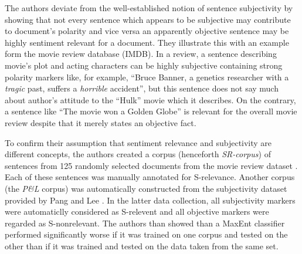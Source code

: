 \documentclass[a4paper,11pt]{article}
\begin{document}
The authors deviate from the well-established notion of sentence
subjectivity by showing that not every sentence which appears to be
subjective may contribute to document's polarity and vice versa an
apparently objective sentence may be highly sentiment relevant for a
document.  They illustrate this with an example form the movie review
database (IMDB).  In a review, a sentence describing movie's plot and
acting characters can be highly subjective containing strong polarity
markers like, for example, ``Bruce Banner, a genetics researcher with
a \textit{tragic} past, suffers a \textit{horrible} accident'', but
this sentence does not say much about author's attitude to the
``Hulk'' movie which it describes.  On the contrary, a sentence like
``The movie won a Golden Globe'' is relevant for the overall movie
review despite that it merely states an objective fact.

To confirm their assumption that sentiment relevance and subjectivity
are different concepts, the authors created a corpus (henceforth
\textit{SR-corpus}) of sentences from 125 randomly selected documents
from the movie review dataset \cite{Pang-Lee-02}.  Each of these sentences
was manually annotated for S-relevance.  Another corpus (the
\textit{P\&L} corpus) was automatically constructed from the
subjectivity dataset provided by Pang and Lee \cite{Pang-Lee-04}.  In
the latter data collection, all subjectivity markers were automaticlly
considered as S-relevent and all objective markers were regarded as
S-nonrelevant.  The authors than showed than a MaxEnt classifier
performed significantly worse if it was trained on one corpus and
tested on the other than if it was trained and tested on the data
taken from the same set.
\end{document}
